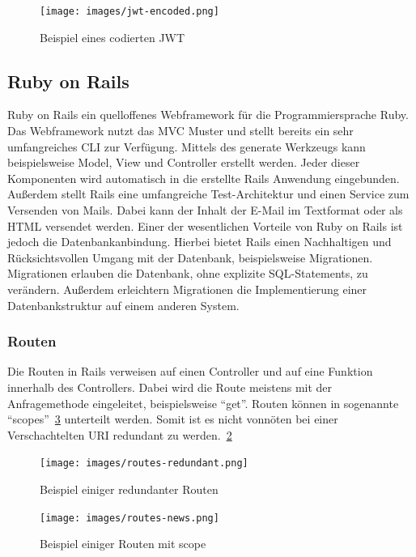 \documentclass[paper=a4,fontsize=12pt,parskip=half]{scrartcl}
\begin{document}
	\begin{figure}[h]
		\texttt{[image: images/jwt-encoded.png]}
		\caption{Beispiel eines codierten \gls{JWT} }
		\label{fig:jwt-encoded}
	\end{figure}
	
	\subsection{Ruby on Rails}
	\label{sec: rails}
	Ruby on Rails ein quelloffenes Webframework für die Programmiersprache Ruby. Das Webframework nutzt das \gls{MVC} Muster und stellt bereits ein sehr umfangreiches \gls{CLI} zur Verfügung. Mittels des generate Werkzeugs kann beispielsweise Model, View und Controller erstellt werden. Jeder dieser Komponenten wird automatisch in die erstellte Rails Anwendung eingebunden. Außerdem stellt Rails eine umfangreiche Test-Architektur und einen Service zum Versenden von Mails. Dabei kann der Inhalt der E-Mail im Textformat oder als \gls{HTML} versendet werden. Einer der wesentlichen Vorteile von Ruby on Rails ist jedoch die Datenbankanbindung. Hierbei bietet Rails einen Nachhaltigen und Rücksichtsvollen Umgang mit der Datenbank, beispielsweise Migrationen. Migrationen erlauben die Datenbank, ohne explizite SQL-Statements, zu verändern. Außerdem erleichtern Migrationen die Implementierung einer Datenbankstruktur auf einem anderen System.
	
	
	\subsubsection{Routen}
	\label{sec: routen}
	Die Routen in Rails verweisen auf einen Controller und auf eine Funktion innerhalb des Controllers. Dabei wird die Route meistens mit der Anfragemethode eingeleitet, beispielsweise \enquote{get}. Routen können in sogenannte \enquote{scopes}~\ref{fig:routes-scope} unterteilt werden. Somit ist es nicht vonnöten bei einer Verschachtelten \gls{URI} redundant zu werden.~\ref{fig:routes-redundant}
	
	\begin{figure}
		\texttt{[image: images/routes-redundant.png]}
		\caption{Beispiel einiger redundanter Routen }
		\label{fig:routes-redundant}
	\end{figure}
	
	\begin{figure}
		\texttt{[image: images/routes-news.png]}
		\caption{Beispiel einiger Routen mit scope }
		\label{fig:routes-scope}
	\end{figure}
	
\end{document}
